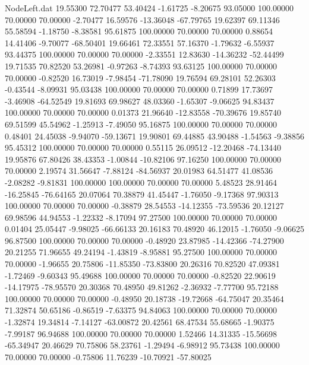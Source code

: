 \begin{filecontents}{NodeLeft.dat}
  19.55300   72.70477   53.40424    -1.61725   -8.20675   93.05000  100.00000   70.00000   70.00000   -2.70477   16.59576  -13.36048  -67.79765
  19.62397   69.11346   55.58594    -1.18750   -8.38581   95.61875  100.00000   70.00000   70.00000    0.88654   14.41406   -9.70077  -68.50401
  19.66461   72.33551   57.16370    -1.79632   -6.55937   93.44375  100.00000   70.00000   70.00000   -2.33551   12.83630  -14.36232  -52.44499
  19.71535   70.82520   53.26981    -0.97263   -8.74393   93.63125  100.00000   70.00000   70.00000   -0.82520   16.73019   -7.98454  -71.78090
  19.76594   69.28101   52.26303    -0.43544   -8.09931   95.03438  100.00000   70.00000   70.00000    0.71899   17.73697   -3.46908  -64.52549
  19.81693   69.98627   48.03360    -1.65307   -9.06625   94.83437  100.00000   70.00000   70.00000    0.01373   21.96640  -12.83558  -70.39676
  19.85740   69.51599   45.54962    -1.25913   -7.49050   95.16875  100.00000   70.00000   70.00000    0.48401   24.45038   -9.94070  -59.13671
  19.90801   69.44885   43.90488    -1.54563   -9.38856   95.45312  100.00000   70.00000   70.00000    0.55115   26.09512  -12.20468  -74.13440
  19.95876   67.80426   38.43353    -1.00844  -10.82106   97.16250  100.00000   70.00000   70.00000    2.19574   31.56647   -7.88124  -84.56937
  20.01983   64.51477   41.08536    -2.08282   -9.81831  100.00000  100.00000   70.00000   70.00000    5.48523   28.91464  -16.25845  -76.64165
  20.07064   70.38879   41.45447    -1.76050   -9.17368   97.90313  100.00000   70.00000   70.00000   -0.38879   28.54553  -14.12355  -73.59536
  20.12127   69.98596   44.94553    -1.22332   -8.17094   97.27500  100.00000   70.00000   70.00000    0.01404   25.05447   -9.98025  -66.66133
  20.16183   70.48920   46.12015    -1.76050   -9.06625   96.87500  100.00000   70.00000   70.00000   -0.48920   23.87985  -14.42366  -74.27900
  20.21255   71.96655   49.24194    -1.43819   -8.95881   95.27500  100.00000   70.00000   70.00000   -1.96655   20.75806  -11.85350  -73.83800
  20.26316   70.82520   47.09381    -1.72469   -9.60343   95.49688  100.00000   70.00000   70.00000   -0.82520   22.90619  -14.17975  -78.95570
  20.30368   70.48950   49.81262    -2.36932   -7.77700   95.72188  100.00000   70.00000   70.00000   -0.48950   20.18738  -19.72668  -64.75047
  20.35464   71.32874   50.65186    -0.86519   -7.63375   94.84063  100.00000   70.00000   70.00000   -1.32874   19.34814   -7.14127  -63.00872
  20.42561   68.47534   55.68665    -1.90375   -7.99187   96.94688  100.00000   70.00000   70.00000    1.52466   14.31335  -15.56698  -65.34947
  20.46629   70.75806   58.23761    -1.29494   -6.98912   95.73438  100.00000   70.00000   70.00000   -0.75806   11.76239  -10.70921  -57.80025

\end{filecontents}
